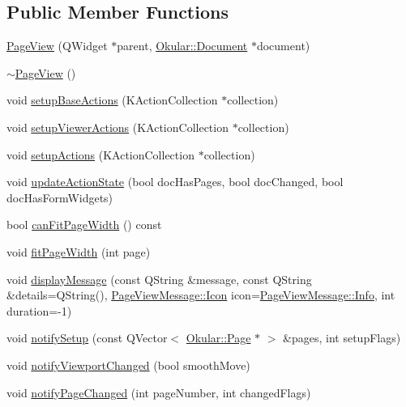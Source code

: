\subsection*{Public Member Functions}
\begin{DoxyCompactItemize}
\item 
\hyperlink{classPageView_aab5ffe3501dffdb181597740e75691a8}{Page\+View} (Q\+Widget $\ast$parent, \hyperlink{classOkular_1_1Document}{Okular\+::\+Document} $\ast$document)
\item 
\hyperlink{classPageView_aa109e889cf63e1aa8f469a169963e255}{$\sim$\+Page\+View} ()
\item 
void \hyperlink{classPageView_a743dd42566e0d285671a861592e133a9}{setup\+Base\+Actions} (K\+Action\+Collection $\ast$collection)
\item 
void \hyperlink{classPageView_a237853c5039228f8825cbc5724787f31}{setup\+Viewer\+Actions} (K\+Action\+Collection $\ast$collection)
\item 
void \hyperlink{classPageView_a8a1b285458297ea9fd6f9d4f2718e614}{setup\+Actions} (K\+Action\+Collection $\ast$collection)
\item 
void \hyperlink{classPageView_a3676a4a9b53502c4b6af945f28cd5179}{update\+Action\+State} (bool doc\+Has\+Pages, bool doc\+Changed, bool doc\+Has\+Form\+Widgets)
\item 
bool \hyperlink{classPageView_ad70c952bdf8229064f7304236d32495b}{can\+Fit\+Page\+Width} () const 
\item 
void \hyperlink{classPageView_a1c4752460636ebe7a7992aa3a54b36e0}{fit\+Page\+Width} (int page)
\item 
void \hyperlink{classPageView_ab9e13eff3e9a67c96985f9f138d35bb1}{display\+Message} (const Q\+String \&message, const Q\+String \&details=Q\+String(), \hyperlink{classPageViewMessage_aeb83801b92379715663d5a7beaa2ae0c}{Page\+View\+Message\+::\+Icon} icon=\hyperlink{classPageViewMessage_aeb83801b92379715663d5a7beaa2ae0ca2ae901576662b28f92067841a52e11dd}{Page\+View\+Message\+::\+Info}, int duration=-\/1)
\item 
void \hyperlink{classPageView_a13961fd5290e1678d34c8aa59864cdaf}{notify\+Setup} (const Q\+Vector$<$ \hyperlink{classOkular_1_1Page}{Okular\+::\+Page} $\ast$ $>$ \&pages, int setup\+Flags)
\item 
void \hyperlink{classPageView_a9b7b1540552e8ce8c4d089e58297493c}{notify\+Viewport\+Changed} (bool smooth\+Move)
\item 
void \hyperlink{classPageView_a5175ad1352eea1674a687f5a0072e874}{notify\+Page\+Changed} (int page\+Number, int changed\+Flags)

\end{DoxyCompactItemize}
